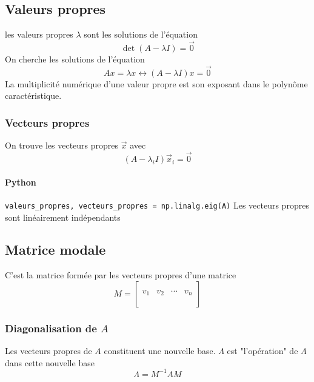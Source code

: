 \documentclass[resume]{subfiles}
\begin{document}
\subsection{Valeurs propres}
les valeurs propres $\lambda$ sont les solutions de l'équation
$$\det\left(A-\lambda I\right)=\vec{0}$$
On cherche les solutions de l'équation
$$\boxed{Ax=\lambda x}\longleftrightarrow \boxed{(A-\lambda I)x=\vec{0}}$$
La multiplicité numérique d'une valeur propre est son exposant dans le polynôme caractéristique.
\subsubsection{Vecteurs propres}
On trouve les vecteurs propres $\vec{x}$ avec
$$\left(A-\lambda_i I\right)\vec{x}_i=\vec{0}$$
\paragraph{Python} \verb!valeurs_propres, vecteurs_propres = np.linalg.eig(A)!
Les vecteurs propres sont linéairement indépendants
\subsection{Matrice modale}
C'est la matrice formée par les vecteurs propres d'une matrice
$$M=\begin{bmatrix}
\\
v_1 & v_2 & \cdots & v_n\\
\\
\end{bmatrix}$$
\subsubsection{Diagonalisation de $A$}
Les vecteurs propres de $A$ constituent une nouvelle base. $\Lambda$ est "l'opération" de $\Lambda$ dans cette nouvelle base
$$\Lambda=M^{-1}AM$$
\end{document}
